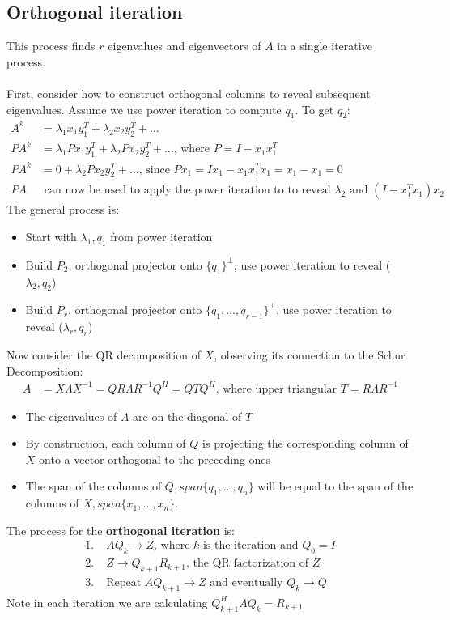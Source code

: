 \documentclass{article}
\begin{document}
\subsection{Orthogonal iteration}
This process finds $r$ eigenvalues and eigenvectors of $A$ in a single iterative process.\\ \\
First, consider how to construct orthogonal columns to reveal subsequent eigenvalues. Assume we use power iteration to compute $q_1$. To get $q_2$:
\begin{align*}
    A^k &= \lambda_1x_1y_1^T + \lambda_2x_2y_2^T + \dots\\
    PA^k &= \lambda_1Px_1y_1^T + \lambda_2Px_2y_2^T + \dots \textrm{, where } P = I - x_1x_1^T\\
    PA^k &= 0 + \lambda_2Px_2y_2^T + \dots \textrm{, since } Px_1 = Ix_1 - x_1x_1^Tx_1 = x_1 - x_1 = 0\\
    PA &\textrm{ can now be used to apply the power iteration to to reveal $\lambda_2$ and } (I - x_1^Tx_1)x_2
\end{align*}
The general process is:
\begin{itemize}
    \item Start with $\lambda_1, q_1$ from power iteration
    \item Build $P_2$, orthogonal projector onto $\{q_1\}^\perp$, use power iteration to reveal ($\lambda_2, q_2$)
    \item Build $P_r$, orthogonal projector onto  $\{q_1, \dots, q_{r-1}\}^\perp$, use power iteration to reveal ($\lambda_r, q_r$)
\end{itemize}
Now consider the QR decomposition of $X$, observing its connection to the Schur Decomposition:
\begin{align*}
    A &= X\Lambda X^{-1} = QR \Lambda R^{-1} Q^H = QTQ^H \textrm{, where upper triangular } T = R\Lambda R^{-1}
\end{align*}
\begin{itemize}
    \item The eigenvalues of $A$ are on the diagonal of $T$
    \item By construction, each column of $Q$ is projecting the corresponding column of $X$ onto a vector orthogonal to the preceding ones
    \item The span of the columns of $Q, span\{q_1, \dots, q_n\}$ will be equal to the span of the columns of $X, span\{x_1, \dots, x_n\}$.
\end{itemize}
The process for the \textbf{orthogonal iteration} is:
\begin{align*}
    1. \;& AQ_k \rightarrow Z \textrm{, where $k$ is the iteration and } Q_0 = I\\
    2. \;& Z \rightarrow Q_{k+1}R_{k+1} \textrm{, the QR factorization of $Z$}\\
    3. \;& \textrm{Repeat } AQ_{k+1} \rightarrow Z \textrm{ and eventually } Q_k \rightarrow Q
\end{align*}
Note in each iteration we are calculating $Q_{k+1}^HAQ_k = R_{k+1}$
\end{document}
